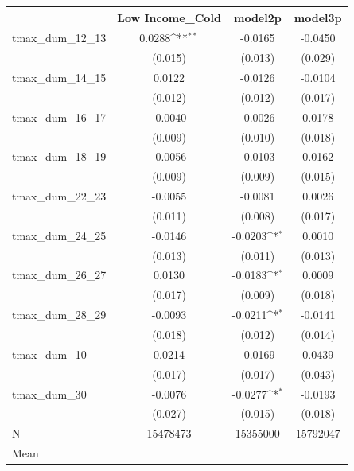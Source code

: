 {
\def\sym#1{\ifmmode^{#1}\else\(^{#1}\)\fi}
\begin{tabular}{l*{3}{c}}
\toprule
            &\multicolumn{1}{c}{Low Income\_Cold}&\multicolumn{1}{c}{model2p}&\multicolumn{1}{c}{model3p}\\
\midrule
tmax\_dum\_12\_13&      0.0288\sym{**} &     -0.0165         &     -0.0450         \\
            &     (0.015)         &     (0.013)         &     (0.029)         \\
tmax\_dum\_14\_15&      0.0122         &     -0.0126         &     -0.0104         \\
            &     (0.012)         &     (0.012)         &     (0.017)         \\
tmax\_dum\_16\_17&     -0.0040         &     -0.0026         &      0.0178         \\
            &     (0.009)         &     (0.010)         &     (0.018)         \\
tmax\_dum\_18\_19&     -0.0056         &     -0.0103         &      0.0162         \\
            &     (0.009)         &     (0.009)         &     (0.015)         \\
tmax\_dum\_22\_23&     -0.0055         &     -0.0081         &      0.0026         \\
            &     (0.011)         &     (0.008)         &     (0.017)         \\
tmax\_dum\_24\_25&     -0.0146         &     -0.0203\sym{*}  &      0.0010         \\
            &     (0.013)         &     (0.011)         &     (0.013)         \\
tmax\_dum\_26\_27&      0.0130         &     -0.0183\sym{*}  &      0.0009         \\
            &     (0.017)         &     (0.009)         &     (0.018)         \\
tmax\_dum\_28\_29&     -0.0093         &     -0.0211\sym{*}  &     -0.0141         \\
            &     (0.018)         &     (0.012)         &     (0.014)         \\
tmax\_dum\_10 &      0.0214         &     -0.0169         &      0.0439         \\
            &     (0.017)         &     (0.017)         &     (0.043)         \\
tmax\_dum\_30 &     -0.0076         &     -0.0277\sym{*}  &     -0.0193         \\
            &     (0.027)         &     (0.015)         &     (0.018)         \\
\midrule
N           &    15478473         &    15355000         &    15792047         \\
Mean        &                     &                     &                     \\
\bottomrule
\end{tabular}
}
